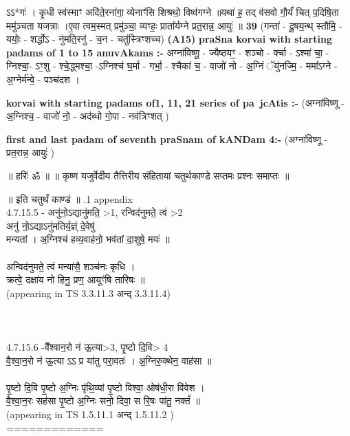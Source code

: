 \documentclass[17pt]{extarticle}
\begin{document}
                  ऽऽ*गः॑ । कृ॒धी स्व॑स्माꣳ अदि॑ते॒रना॑गा॒ व्येनाꣳ॑सि शिश्रथो॒ विष्व॑गग्ने ॥यथा॑ ह॒ तद् व॑सवो गौ॒र्यं॑ चित् प॒दिषि॒ता ममु॑ञ्चता यजत्राः ।ए॒वा त्वम॒स्मत् प्रमु॑ञ्चा॒ व्यꣳहः॒ प्राता᳚र्यग्ने प्रत॒रान्न॒ आयुः॑ ॥ \textbf{  39 } \newline
                  \newline
                      (गन्ता॑ - दू॒षय॒न्थ् स्तौमि॒ - ययोः॒ - शर्द्धोऽ - नु॑मति॒रनु॑ - च॒न - चतु॑स्त्रिꣳशच्च)  \textbf{(A15)} \newline \newline
                \textbf{praSna korvai with starting padams of 1 to 15 anuvAkams :-} \newline
        अग्ना॑विष्णू॒ - ज्यैष्ठयꣳ॒॒ - शञ्चो - र्क्चा - ऽश्मा॑ चा॒ - ग्निश्चा॒- ऽꣳ॒शु - श्चे॒द्ध्मश्चा॒ -ऽग्निश्च॑ घ॒र्मा - गर्भा॒ - श्चैका॑ च॒ - वाजो॑ नो - अ॒ग्निं ॅयु॑नज्मि॒ - ममा᳚ऽग्ने - अ॒ग्नेर्म॑न्वे॒ - पञ्च॑दश । \newline

        \textbf{korvai with starting padams of1, 11, 21 series of pa~jcAtis :-} \newline
        (अग्ना॑विष्णू - अ॒ग्निश्च॒ - वाजो॑ नो॒ - अद॑ब्धो गो॒पा - नव॑त्रिꣳशत् ) \newline

        \textbf{first and last padam of seventh praSnam of kANDam 4:-} \newline
        (अग्ना॑विष्णू - प्रत॒रान्न॒ आयुः॑ ) \newline 

        
        ॥ हरिः॑ ॐ ॥
॥ कृष्ण यजुर्वेदीय तैत्तिरीय संहितायां चतुर्थकाण्डे सप्तमः प्रश्नः समाप्तः ॥

॥ इति चतुर्थं काण्डं ॥ \newline
        .1   appendix\\4.7.15.5 - अनु॑नो॒ऽद्यानु॑मति॒ >1, रन्विद॑नुमते॒ त्वं >2\\अनु॑ नो॒ऽद्याऽनु॑मतिर्य॒ज्ञ्ं दे॒वेषु॑ \\मन्यतां । अ॒ग्निश्च॑ हव्य॒वाह॑नो॒ भव॑तां दा॒शुषे॒ मयः॑ ॥\\\\अन्विद॑नुमते॒ त्वं मन्या॑सै॒ शञ्च॑नः कृधि । \\क्रत्वे॒ दक्षा॑य नो हिनु॒ प्रण॒ आयूꣳ॑षि तारिषः ॥\\(appearing in TS 3.3.11.3 अन्द् 3.3.11.4)\\\\\\\\4.7.15.6 -वै᳚श्वान॒रो न॑ ऊ॒त्या>3, पृ॒ष्टो दि॒वि> 4\\वै॒श्वा॒न॒रो न॑ ऊ॒त्या ऽऽ प्र या॑तु परा॒वतः॑ । अ॒ग्निरु॒क्थेन॒ वाह॑सा ॥\\\\पृ॒ष्टो दि॒वि पृ॒ष्टो अ॒ग्निः पृ॑थि॒व्यां पृ॒ष्टो विश्वा॒ ओष॑धी॒रा वि॑वेश । \\वै॒श्वा॒न॒रः सह॑सा पृ॒ष्टो अ॒ग्निः सनो॒ दिवा॒ स रि॒षः पा॑तु॒ नक्तं᳚ ॥ \\(appearing in TS 1.5.11.1 अन्द् 1.5.11.2 )\\=============\\\\
                \pagebreak
        
\end{document}

